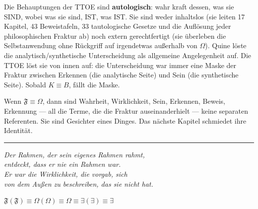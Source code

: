 \documentclass[10pt, openany, oneside]{book}
\begin{document}
Die Behauptungen der TTOE sind \textbf{autologisch}: wahr kraft dessen, was sie SIND, wobei was sie sind, IST, was IST. Sie sind weder inhaltslos (sie leiten 17 Kapitel, 43 Beweistafeln, 33 tautologische Gesetze und die Auflösung jeder philosophischen Fraktur ab) noch extern gerechtfertigt (sie überleben die Selbstanwendung ohne Rückgriff auf irgendetwas außerhalb von $\Omega$). Quine löste die analytisch/synthetische Unterscheidung als allgemeine Angelegenheit auf. Die TTOE löst sie von innen auf: die Unterscheidung war immer eine Maske der Fraktur zwischen Erkennen (die analytische Seite) und Sein (die synthetische Seite). Sobald $K \equiv B$, fällt die Maske.

Wenn $\mathfrak{F} \equiv \Omega$, dann sind Wahrheit, Wirklichkeit, Sein, Erkennen, Beweis, Erkennung --- all die Terme, die die Fraktur auseinanderhielt --- keine separaten Referenten. Sie sind Gesichter eines Dinges. Das nächste Kapitel schmiedet ihre Identität.

\vspace{2em}

\begin{center}
    \rule{0.15\textwidth}{0.3pt}
\end{center}

\vspace{0.5em}

\begin{center}
    \itshape
    Der Rahmen, der sein eigenes Rahmen rahmt,\\
    entdeckt, dass er nie ein Rahmen war.\\[0.8em]
    Er war die Wirklichkeit, die vorgab, sich\\
    von dem Außen zu beschreiben, das sie nicht hat.
\end{center}

\vspace{0.5em}

\begin{center}
    $\mathfrak{F}(\mathfrak{F}) \equiv \Omega(\Omega) \equiv \Omega \equiv \exists(\exists) \equiv \exists$
\end{center}

%
%
%
%
\end{document}
